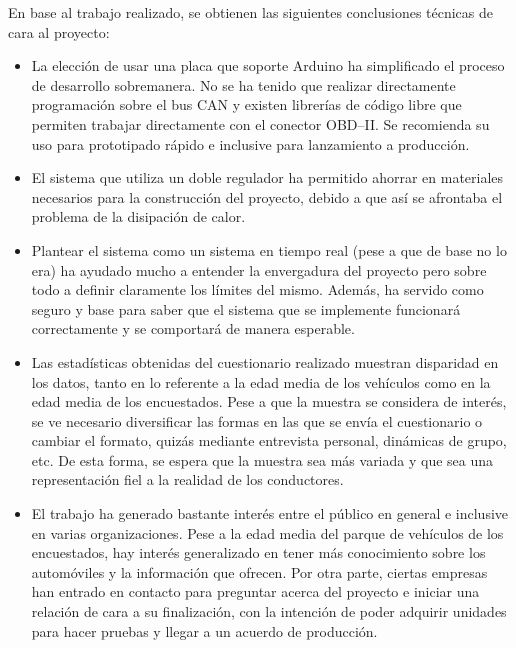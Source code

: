 En base al trabajo realizado, se obtienen las siguientes conclusiones técnicas de
cara al proyecto:

\begin{itemize}
  \item La elección de usar una placa que soporte Arduino ha simplificado
        el proceso de desarrollo sobremanera. No se ha tenido que realizar
        directamente programación sobre el bus \ac{CAN} y existen librerías
        de código libre que permiten trabajar directamente con el conector
        \ac{OBD}--II. Se recomienda su uso para prototipado rápido e inclusive
        para lanzamiento a producción.
  \item El sistema que utiliza un doble regulador ha permitido ahorrar
        en materiales necesarios para la construcción del proyecto, debido
        a que así se afrontaba el problema de la disipación de calor.
  \item Plantear el sistema como un sistema en tiempo real (pese a que
        de base no lo era) ha ayudado mucho a entender la envergadura
        del proyecto pero sobre todo a definir claramente los límites del
        mismo. Además, ha servido como seguro y base para saber que el
        sistema que se implemente funcionará correctamente y se comportará
        de manera esperable.
  \item Las estadísticas obtenidas del cuestionario realizado muestran
        disparidad en los datos, tanto en lo referente a la edad media de
        los vehículos como en la edad media de los encuestados. Pese a que
        la muestra se considera de interés, se ve necesario diversificar
        las formas en las que se envía el cuestionario o cambiar el formato,
        quizás mediante entrevista personal, dinámicas de grupo, etc. De
        esta forma, se espera que la muestra sea más variada y que sea
        una representación fiel a la realidad de los conductores.
  \item El trabajo ha generado bastante interés entre el público en general
        e inclusive en varias organizaciones. Pese a la edad media del parque
        de vehículos de los encuestados, hay interés generalizado en tener
        más conocimiento sobre los automóviles y la información que ofrecen.
        Por otra parte, ciertas empresas han entrado en contacto para preguntar
        acerca del proyecto e iniciar una relación de cara a su finalización,
        con la intención de poder adquirir unidades para hacer pruebas y
        llegar a un acuerdo de producción.
\end{itemize}
